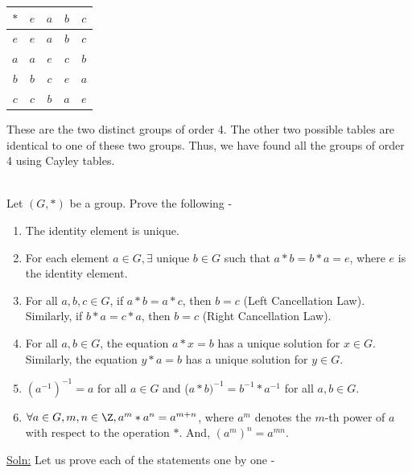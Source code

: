 \documentclass[openany]{book}
\begin{document}
\begin{center}
\begin{tabular}{c|c|c|c|c|}
    $*$ & $e$ & $a$ & $b$ & $c$ \\
    \hline
    $e$ & $e$ & $a$ & $b$ & $c$ \\
    $a$ & $a$ & $e$ & $c$ & $b$ \\
    $b$ & $b$ & $c$ & $e$ & $a$ \\
    $c$ & $c$ & $b$ & $a$ & $e$ \\
\end{tabular}
\end{center}
These are the two distinct groups of order 4. The other two possible tables are identical to one of these two groups. Thus, we have found all the groups of order 4 using Cayley tables. \\ \\
\begin{exercise}
    Let $(G, *)$ be a group. Prove the following -
    \begin{enumerate}
        \item The identity element is unique.
        \item For each element $a \in G, \exists \text{ unique } b \in G$ such that $a * b = b * a = e$, where $e$ is the identity element.
        \item For all $a, b, c \in G$, if $a * b = a * c$, then $b = c$ (Left Cancellation Law). Similarly, if $b * a = c * a$, then $b = c$ (Right Cancellation Law).
        \item For all $a, b \in G$, the equation $a * x = b$ has a unique solution for $x \in G$. Similarly, the equation $y * a = b$ has a unique solution for $y \in G$.
        \item $(a^{-1})^{-1} = a$ for all $a \in G$ and ($a * b)^{-1} = b^{-1} * a^{-1}$ for all $a, b \in G$.
        \item $\forall a \in G, m, n \in \Z, a^m * a^n = a^{m+n}$, where $a^m$ denotes the $m$-th power of $a$ with respect to the operation $*$. And, $(a^m)^n = a^{mn}$. 
    \end{enumerate}
\end{exercise}
\underline{Soln:} Let us prove each of the statements one by one -
\end{document}
